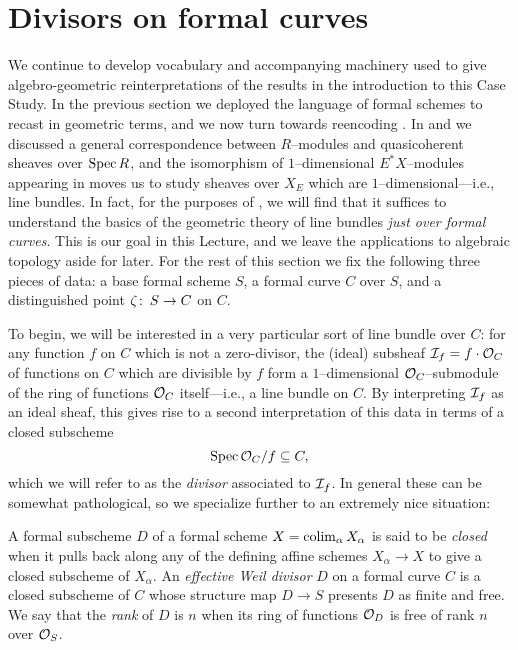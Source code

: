 \section{Divisors on formal curves}\label{CurveDivisorsSection}

We continue to develop vocabulary and accompanying machinery used to give algebro-geometric reinterpretations of the results in the introduction to this Case Study.  In the previous section we deployed the language of formal schemes to recast  in geometric terms, and we now turn towards reencoding .  In  and  we discussed a general correspondence between \(R\)--modules and quasicoherent sheaves over \(\operatorname{Spec} R\), and the isomorphism of \(1\)--dimensional \(E^* X\)--modules appearing in  moves us to study sheaves over \(X_E\) which are \(1\)--dimensional---i.e., line bundles.  In fact, for the purposes of , we will find that it suffices to understand the basics of the geometric theory of line bundles \emph{just over formal curves}.  This is our goal in this Lecture, and we leave the applications to algebraic topology aside for later.  For the rest of this section we fix the following three pieces of data: a base formal scheme \(S\), a formal curve \(C\) over \(S\), and a distinguished point \(\zeta\colon\thinspace S \to C\) on \(C\).

To begin, we will be interested in a very particular sort of line bundle over \(C\): for any function \(f\) on \(C\) which is not a zero-divisor, the (ideal) subsheaf \(\mathcal{I}_f = f \cdot \mathcal{O}_C\) of functions on \(C\) which are divisible by \(f\) form a \(1\)--dimensional \(\mathcal{O}_C\)--submodule of the ring of functions \(\mathcal{O}_C\) itself---i.e., a line bundle on \(C\).  By interpreting \(\mathcal{I}_f\) as an ideal sheaf, this gives rise to a second interpretation of this data in terms of a closed subscheme \[\operatorname{Spec} \mathcal{O}_C / f \subseteq C,\] which we will refer to as the \textit{divisor} associated to \(\mathcal{I}_f\).  In general these can be somewhat pathological, so we specialize further to an extremely nice situation:

\begin{definition}
A formal subscheme \(D\) of a formal scheme \(X = \operatorname*{colim}_\alpha X_\alpha\) is said to be \textit{closed} when it pulls back along any of the defining affine schemes \(X_\alpha \to X\) to give a closed subscheme of \(X_\alpha\).  An \textit{effective Weil divisor} \(D\) on a formal curve \(C\) is a closed subscheme of \(C\) whose structure map \(D \to S\) presents \(D\) as finite and free.  We say that the \textit{rank} of \(D\) is \(n\) when its ring of functions \(\mathcal{O}_D\) is free of rank \(n\) over \(\mathcal{O}_S\).
\end{definition}

